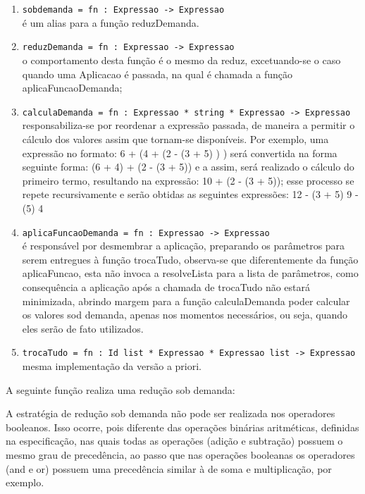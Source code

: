 \documentclass[brazil,times]{abnt}
\begin{document}
\begin{enumerate}
    \item \texttt{sobdemanda = fn : Expressao -> Expressao} \\ é um alias para a função reduzDemanda.

    \item \texttt{reduzDemanda = fn : Expressao -> Expressao} \\ o comportamento desta função é o mesmo da reduz, excetuando-se o caso quando uma Aplicacao é passada, na qual é chamada a função aplicaFuncaoDemanda;

    
     \item \texttt{calculaDemanda = fn : Expressao * string * Expressao -> Expressao} \\ responsabiliza-se por reordenar a expressão passada, de maneira a permitir o cálculo dos valores assim que tornam-se disponíveis. Por exemplo, uma expressão no formato: 6 + (4 + (2 - (3 + 5) ) ) será convertida na forma seguinte forma: (6 + 4) + (2 - (3 + 5)) e a assim, será realizado o cálculo do primeiro termo, resultando na expressão: 10 + (2 - (3 + 5)); esse processo se repete recursivamente e serão obtidas as seguintes expressões:
     12 - (3 + 5)
     9 - (5)
     4
     
     \item \texttt{aplicaFuncaoDemanda = fn : Expressao -> Expressao} \\ é responsável por desmembrar a aplicação, preparando os parâmetros para serem entregues à função trocaTudo, observa-se que diferentemente da função aplicaFuncao, esta não invoca a resolveLista para a lista de parâmetros, como consequência a aplicação após a chamada de trocaTudo não estará minimizada, abrindo margem para a função calculaDemanda poder calcular os valores sod demanda, apenas nos momentos necessários, ou seja, quando eles serão de fato utilizados.
     
     \item \texttt{trocaTudo = fn : Id list * Expressao * Expressao list -> Expressao} \\ mesma implementação da versão a priori.
     
\end{enumerate}



A seguinte função realiza uma redução sob demanda:

A estratégia de redução sob demanda não pode ser realizada nos operadores booleanos. Isso ocorre, pois diferente das operações binárias aritméticas, definidas na especificação, nas quais todas as operações (adição e subtração) possuem o mesmo grau de precedência, ao passo que nas operações booleanas os operadores (and e or) possuem uma precedência similar à de soma e multiplicação, por exemplo.
\end{document}
